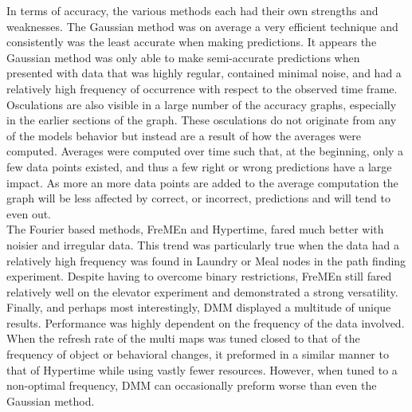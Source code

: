 In terms of accuracy, the various methods each had their own strengths and
weaknesses. The Gaussian method was on average a very efficient
technique and consistently was the least accurate when making predictions. It appears the
Gaussian method was only able to make semi-accurate predictions when presented
with data that was highly regular, contained minimal noise, and had a
relatively high frequency of occurrence with respect to the observed time
frame. Osculations are also visible in a large number of the accuracy graphs,
especially in the earlier sections of the graph. These osculations do not
originate from any of the models behavior but instead are a result of how the
averages were computed. Averages were computed over time such that, at the
beginning, only a few data points existed, and thus a few right or wrong
predictions have a large impact. As more an more data points are added to the
average computation the graph will be less affected by correct, or incorrect,
predictions and will tend to even out. \\

The Fourier based methods, FreMEn and Hypertime, fared much better
with noisier and irregular data. This trend was particularly true when the data
had a relatively high frequency was found in Laundry or Meal nodes in the
path finding experiment. Despite having to overcome binary restrictions, FreMEn
still fared relatively well on the elevator experiment and demonstrated a strong
versatility. Finally, and perhaps most interestingly, DMM
displayed a multitude of unique results. Performance was highly dependent
on the frequency of the data involved. When the refresh rate of the multi maps
was tuned closed to that of the frequency of object or behavioral changes, it
preformed in a similar manner to that of Hypertime while using vastly fewer
resources. However, when tuned to a non-optimal frequency, DMM can occasionally
preform worse than even the Gaussian method. \\


